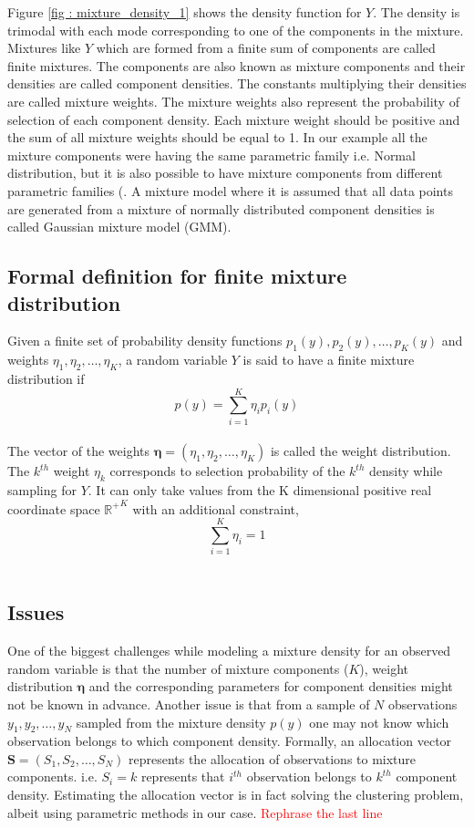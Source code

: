 Figure \ref{fig : mixture_density_1} shows the density function for $Y$. The density is trimodal with each mode corresponding to one of the components in the mixture. Mixtures like $Y$ which are formed from a finite sum of components are called finite mixtures. The components are also known as mixture components and their densities are called component densities. The constants multiplying their densities are called mixture weights. The mixture weights also represent the probability of selection of each component density. Each mixture weight should be positive and the sum of all mixture weights should be equal to 1. In our example all the  mixture components were having the same parametric family i.e. Normal distribution, but it is also possible to have mixture components from different parametric families (\citealp[pg. 4]{fruhwirth-schnatter_finite_2013}. A mixture model where it is assumed that all data points are generated from a mixture of normally distributed component densities is called Gaussian mixture model (GMM).

\subsection{Formal definition for finite mixture distribution}
Given a finite set of probability density functions $p_1(y), p_2(y), \ldots , p_K(y)$ and weights $\eta_1, \eta_2, \ldots , \eta_K$, a random variable $Y$ is said to have a finite mixture distribution if\\
$$p(y) = \sum_{i=1}^{K} \eta_{i} p_{i}(y)$$\\
The vector of the weights $\boldsymbol{\eta} = (\eta_1, \eta_2, \ldots , \eta_K)$ is called the weight distribution. The $k^{th}$ weight $\eta_{k}$ corresponds to selection probability of the $k^{th}$ density while sampling for $Y$. It can only take values from the K dimensional positive real coordinate space ${\mathbb{R}^{+}}^K$ with an additional constraint,\\
$$\sum_{i=1}^{K} \eta_{i} = 1$$\\


\subsection{Issues}
\label{subsec : issues_mixture_density}
One of the biggest challenges while modeling a mixture density for an observed random variable is that the number of mixture components ($K$), weight distribution $\boldsymbol{\eta}$ and the corresponding parameters for component densities might not be known in advance. Another issue is that from a sample of $N$ observations $y_1, y_2, \ldots , y_N$ sampled from the mixture density $p(y)$ one may not know which observation belongs to which component density. Formally, an allocation vector $\boldsymbol{S} = (S_1, S_2,\ldots , S_N)$ represents the allocation of observations to mixture components. i.e. $S_i = k$ represents that $i^{th}$ observation belongs to $k^{th}$ component density. Estimating the allocation vector is in fact solving the clustering problem, albeit using parametric methods in our case. \textcolor{red}{Rephrase the last line}


